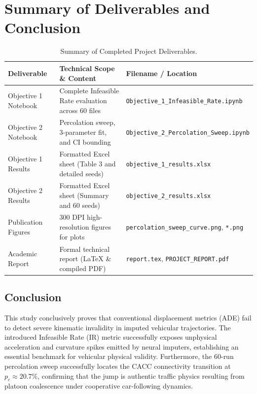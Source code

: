 \documentclass[11pt,a4paper]{article}
\begin{document}
\section{Summary of Deliverables and Conclusion}

\begin{table}[h!]
    \centering
    \caption{Summary of Completed Project Deliverables.}
    \label{tab:deliverables}
    \small
    \begin{tabularx}{\textwidth}{@{} l X l @{}}
        \toprule
        \textbf{Deliverable} & \textbf{Technical Scope \& Content} & \textbf{Filename / Location} \\
        \midrule
        Objective 1 Notebook & Complete Infeasible Rate evaluation across 60 files & \texttt{Objective\_1\_Infeasible\_Rate.ipynb} \\
        Objective 2 Notebook & Percolation sweep, 3-parameter fit, and CI bounding & \texttt{Objective\_2\_Percolation\_Sweep.ipynb} \\
        Objective 1 Results & Formatted Excel sheet (Table 3 and detailed seeds) & \texttt{objective\_1\_results.xlsx} \\
        Objective 2 Results & Formatted Excel sheet (Summary and 60 seeds) & \texttt{objective\_2\_results.xlsx} \\
        Publication Figures & 300 DPI high-resolution figures for plots & \texttt{percolation\_sweep\_curve.png}, \texttt{*.png} \\
        Academic Report & Formal technical report (LaTeX \& compiled PDF) & \texttt{report.tex}, \texttt{PROJECT\_REPORT.pdf} \\
        \bottomrule
    \end{tabularx}
\end{table}

\subsection{Conclusion}
This study conclusively proves that conventional displacement metrics (ADE) fail to detect severe kinematic invalidity in imputed vehicular trajectories. The introduced Infeasible Rate (IR) metric successfully exposes unphysical acceleration and curvature spikes emitted by neural imputers, establishing an essential benchmark for vehicular physical validity. Furthermore, the 60-run percolation sweep successfully locates the CACC connectivity transition at $p_c \approx 20.7\%$, confirming that the jump is authentic traffic physics resulting from platoon coalescence under cooperative car-following dynamics.
\end{document}
